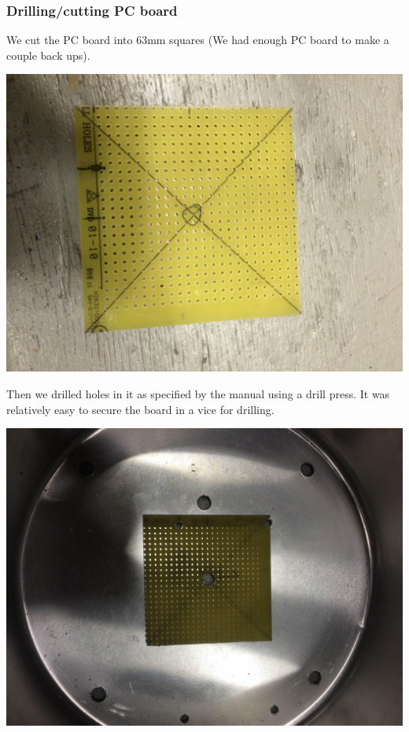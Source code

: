\documentclass[11pt]{article} %
\begin{document}
\subsubsection{Drilling/cutting PC board}
We cut the PC board into 63mm squares (We had enough PC board to make a couple back ups). 

\begin{center}
\includegraphics[scale=0.08]{feed/15.jpeg}
\end{center}


Then we drilled holes in it as specified by the manual using a drill press. It was relatively easy to secure the board in a vice for drilling. 

\begin{center}
\includegraphics[scale=0.08]{feed/16.jpeg}
\end{center}
\end{document}
